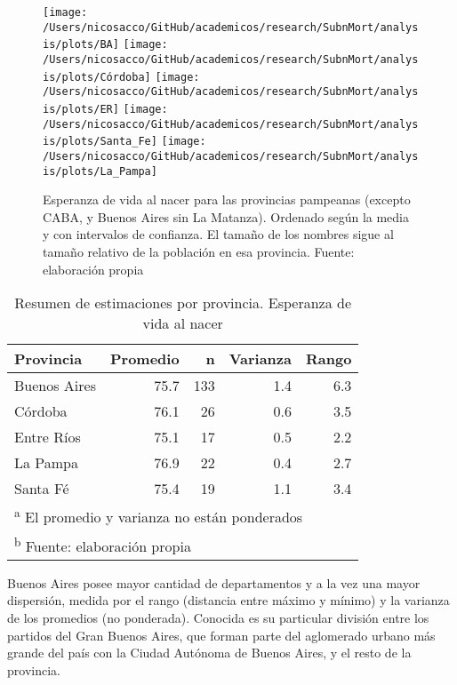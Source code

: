 \documentclass[12pt,]{article}
\begin{document}
\begin{figure}

{\centering \texttt{[image: /Users/nicosacco/GitHub/academicos/research/SubnMort/analysis/plots/BA]} \texttt{[image: /Users/nicosacco/GitHub/academicos/research/SubnMort/analysis/plots/Córdoba]} \texttt{[image: /Users/nicosacco/GitHub/academicos/research/SubnMort/analysis/plots/ER]} \texttt{[image: /Users/nicosacco/GitHub/academicos/research/SubnMort/analysis/plots/Santa\_Fe]} \texttt{[image: /Users/nicosacco/GitHub/academicos/research/SubnMort/analysis/plots/La\_Pampa]} 

}

\caption{Esperanza de vida al nacer para las provincias pampeanas (excepto CABA, y Buenos Aires sin La Matanza). Ordenado según la media y con intervalos de confianza. El tamaño de los nombres sigue al tamaño relativo de la población en esa provincia. Fuente: elaboración propia}\label{fig:jerarq}
\end{figure}

\begin{table}

\caption{\label{tab:dispersion}Resumen de estimaciones por provincia. Esperanza de vida al nacer}
\centering
\begin{tabular}[t]{l|r|r|r|r}
\hline
Provincia & Promedio & n & Varianza & Rango\\
\hline
Buenos Aires & 75.7 & 133 & 1.4 & 6.3\\
\hline
Córdoba & 76.1 & 26 & 0.6 & 3.5\\
\hline
Entre Ríos & 75.1 & 17 & 0.5 & 2.2\\
\hline
La Pampa & 76.9 & 22 & 0.4 & 2.7\\
\hline
Santa Fé & 75.4 & 19 & 1.1 & 3.4\\
\hline
\multicolumn{5}{l}{\textsuperscript{a} El promedio y varianza no están ponderados}\\
\multicolumn{5}{l}{\textsuperscript{b} Fuente: elaboración propia}\\
\end{tabular}
\end{table}

Buenos Aires posee mayor cantidad de departamentos y a la vez una mayor
dispersión, medida por el rango (distancia entre máximo y mínimo) y la
varianza de los promedios (no ponderada). Conocida es su particular
división entre los partidos del Gran Buenos Aires, que forman parte del
aglomerado urbano más grande del país con la Ciudad Autónoma de Buenos
Aires, y el resto de la provincia.
\end{document}
